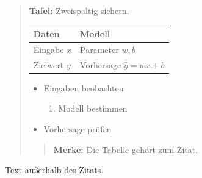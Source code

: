 \begin{frame}[t]
\begin{quote}
\textbf{Tafel:} Zweispaltig sichern.

\par\addvspace{\medskipamount}
\noindent\begin{tabularx}{\linewidth}{@{}>{\raggedright\arraybackslash}p{}>{\raggedright\arraybackslash}X@{}}
\toprule
Daten & Modell \\
\midrule
Eingabe $x$ & Parameter $w,b$ \\
Zielwert $y$ & Vorhersage $\hat y=wx+b$ \\
\bottomrule
\end{tabularx}
\par\addvspace{\medskipamount}

\begin{itemize}
\item Eingaben beobachten
\begin{enumerate}
\item Modell bestimmen
\end{enumerate}
\item Vorhersage prüfen
\end{itemize}

\begin{quote}
\textbf{Merke:} Die Tabelle gehört zum Zitat.
\end{quote}
\end{quote}

Text außerhalb des Zitats.

\end{frame}

